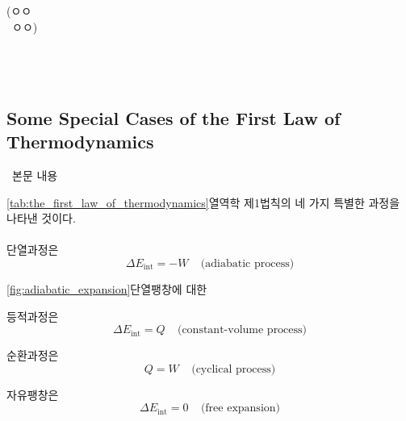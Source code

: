 \begin{solbox}
\bnset
{} \\
\bn  \\
\bn  \\
\bn  \\
\hspace*{1em} (ㅇㅇ \\
\hspace*{1em} \, ㅇㅇ) \\

 \\
 \\
 \\

\end{solbox}

\subsection{Some Special Cases of the First Law of Thermodynamics}
%
\ 본문 내용

\thefirstlawofthermodynamics
{}%
\autoref{tab:the_first_law_of_thermodynamics}\은 열역학 제1법칙의 네 가지 특별한 과정을 나타낸 것이다. \\
\\
\anset
{} 단열과정은
\begin{equation} \Delta E_{\text{int}} = -W ~~~~~ \text{(adiabatic process)} \end{equation}

\adiabaticexpansion
{}%
\autoref{fig:adiabatic_expansion}\은 단열팽창에 대한 

 등적과정은
\begin{equation} \Delta E_{\text{int}} = Q ~~~~~ \text{(constant-volume process)} \end{equation}

 순환과정은
\begin{equation} Q = W ~~~~~ \text{(cyclical process)} \end{equation}

 자유팽창은
\begin{equation} \Delta E_{\text{int}} = 0 ~~~~~ \text{(free expansion)} \end{equation}

